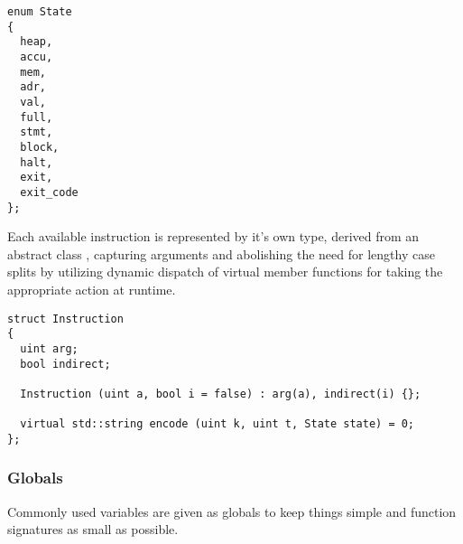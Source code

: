 \begin{lstlisting}[style=c++]
enum State
{
  heap,
  accu,
  mem,
  adr,
  val,
  full,
  stmt,
  block,
  halt,
  exit,
  exit_code
};
\end{lstlisting}
Each available instruction is represented by it's own type, derived from an abstract class , capturing arguments and abolishing the need for lengthy case splits by utilizing dynamic dispatch of virtual member functions for taking the appropriate action at runtime.%
\begin{lstlisting}[style=c++]
struct Instruction
{
  uint arg;
  bool indirect;

  Instruction (uint a, bool i = false) : arg(a), indirect(i) {};

  virtual std::string encode (uint k, uint t, State state) = 0;
};
\end{lstlisting}

\subsubsection*{Globals}

Commonly used variables are given as globals to keep things simple and function signatures as small as possible.

